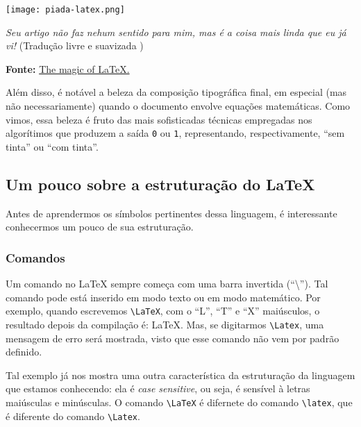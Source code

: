 \begin{marginfigure}
  \texttt{[image: piada-latex.png]}
  
  {
    \sffamily
    \textit{Seu artigo não faz nehum sentido para 
    mim, mas é a coisa mais linda que eu já vi!}
    (Tradução livre e suavizada )
  }
  
  {\textsf{\textbf{Fonte:}} \href{http://nvisnjic.com/2015/01/13/mathjax-magic.html}{The magic of LaTeX.}}
\end{marginfigure}

Além disso, é notável a beleza da composição tipográfica final, em especial (mas
não necessariamente) quando o documento envolve equações matemáticas.
Como vimos, essa \textsf{beleza} é fruto das mais sofisticadas técnicas empregadas 
nos algorítimos que produzem a saída \texttt{0} ou \texttt{1}, representando, 
respectivamente, ``sem tinta'' ou ``com tinta''.

\subsection{Um pouco sobre a estruturação do LaTeX} %

Antes de aprendermos os símbolos pertinentes dessa linguagem, é interessante 
conhecermos um pouco de sua estruturação.
% 
  \subsubsection{Comandos}
% 
Um comando no \LaTeX{} sempre começa com uma barra invertida (``\textbackslash'').
Tal comando pode está inserido em \textsf{modo texto} ou em \textsf{modo matemático}.
Por exemplo, quando escrevemos \verb|\LaTeX|, com o ``L'', ``T'' e ``X'' maiúsculos, 
o resultado depois da compilação é: \LaTeX.
Mas, se digitarmos \verb|\Latex|, uma mensagem de erro será mostrada, visto que 
esse comando não vem por padrão definido.

Tal exemplo já nos mostra uma outra característica da estruturação da linguagem 
que estamos conhecendo: ela é \textit{case sensitive}, ou seja, é sensível à
letras maiúsculas e minúsculas.
O comando \verb|\LaTeX| é difernete do comando \verb|\latex|, que é diferente do
comando \verb|\Latex|.

